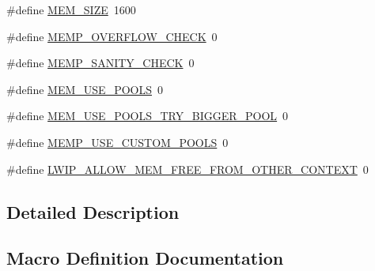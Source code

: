 \begin{DoxyCompactItemize}
\item 
\#define \hyperlink{group__lwip__opts__mem_ga2dcf8c45f945dd0c4301a94700f2112c}{M\+E\+M\+\_\+\+S\+I\+ZE}~1600
\item 
\#define \hyperlink{group__lwip__opts__mem_ga27fdd01194a42fc41a7716b72cdb49e3}{M\+E\+M\+P\+\_\+\+O\+V\+E\+R\+F\+L\+O\+W\+\_\+\+C\+H\+E\+CK}~0
\item 
\#define \hyperlink{group__lwip__opts__mem_ga0838947193e222a9f46b582e01e5beff}{M\+E\+M\+P\+\_\+\+S\+A\+N\+I\+T\+Y\+\_\+\+C\+H\+E\+CK}~0
\item 
\#define \hyperlink{group__lwip__opts__mem_gaddca3141bc7037241769eb152b6f89ba}{M\+E\+M\+\_\+\+U\+S\+E\+\_\+\+P\+O\+O\+LS}~0
\item 
\#define \hyperlink{group__lwip__opts__mem_gaba8be68e8fd0716b723ce4569ed89f82}{M\+E\+M\+\_\+\+U\+S\+E\+\_\+\+P\+O\+O\+L\+S\+\_\+\+T\+R\+Y\+\_\+\+B\+I\+G\+G\+E\+R\+\_\+\+P\+O\+OL}~0
\item 
\#define \hyperlink{group__lwip__opts__mem_ga69de593b8ffd4f1c249f03e48e11983b}{M\+E\+M\+P\+\_\+\+U\+S\+E\+\_\+\+C\+U\+S\+T\+O\+M\+\_\+\+P\+O\+O\+LS}~0
\item 
\#define \hyperlink{group__lwip__opts__mem_ga0a3ef6098813c103e5aba07da76e15e2}{L\+W\+I\+P\+\_\+\+A\+L\+L\+O\+W\+\_\+\+M\+E\+M\+\_\+\+F\+R\+E\+E\+\_\+\+F\+R\+O\+M\+\_\+\+O\+T\+H\+E\+R\+\_\+\+C\+O\+N\+T\+E\+XT}~0
\end{DoxyCompactItemize}


\subsection{Detailed Description}


\subsection{Macro Definition Documentation}
\mbox{\label{group__lwip__opts__mem_ga0a3ef6098813c103e5aba07da76e15e2}} 
